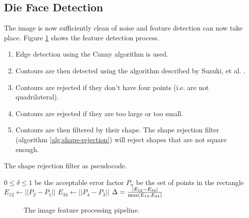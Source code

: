 \documentclass[conference]{IEEEtran}
\begin{document}
\subsection{Die Face Detection}
The image is now sufficiently clean of noise and feature detection can now take place.
Figure \ref{fig:feature-detection} shows the feature detection process.
\begin{enumerate}
	\item Edge detection using the Canny \cite{Canny1986} algorithm is used. %
	\item Contours are then detected using the algorithm described by Suzuki, et al. \cite{Suzuki1985}.
	\item Contours are rejected if they don't have four points (i.e. are not quadrilateral).
	\item Contours are rejected if they are too large or too small.
	\item Contours are then filtered by their shape. The shape rejection filter (algorithm \ref{alg:shape-rejection}) will reject shapes that are not square enough.
\end{enumerate}
\begin{algorithm}
	\caption{The shape rejection filter as pseudocode.}
	\label{alg:shape-rejection}
	\begin{algorithmic}
		\REQUIRE $0 \leq \delta \leq 1$ be the acceptable error factor
		\REQUIRE $P_n$ be the set of points in the rectangle
		\STATE $E_{12} \leftarrow ||P_2 - P_1||$
		\STATE $E_{34} \leftarrow ||P_4 - P_3||$
		\STATE $\Delta = \frac{|E_{12} - E_{34}|}{\textnormal{max}(E_{12}, E_{34})}$
		\IF {$\Delta \leq \delta$} \RETURN \TRUE \ELSE \RETURN \FALSE \ENDIF
	\end{algorithmic}
\end{algorithm}
\begin{figure}
	\centering
	\caption{The image feature processing pipeline.}
	\label{fig:feature-detection}
\end{figure}
\end{document}
